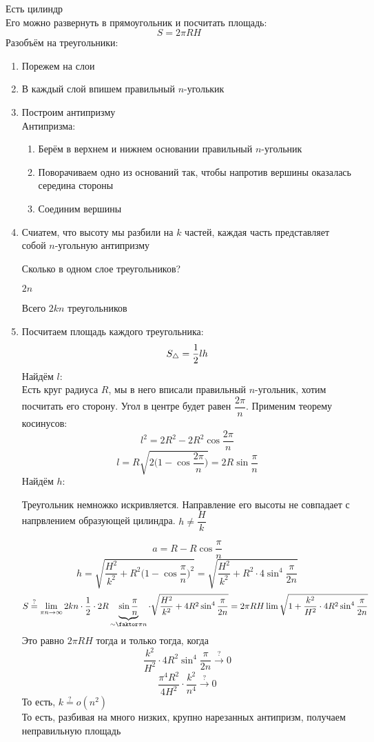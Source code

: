 \begin{eg}
	Есть цилиндр \\
	Его можно развернуть в прямоугольник и посчитать площадь:
	$$ S = 2\pi R H $$
	Разобъём на треугольники:
	\begin{enumerate}
		\item Порежем на слои
		\item В каждый слой впишем правильный $ n $-уголькик
		\item Построим антипризму \\
		Антипризма:
		\begin{enumerate}
			\item Берём в верхнем и нижнем основании правильный $ n $-угольник
			\item Поворачиваем одно из оснований так, чтобы напротив вершины оказалась середина стороны
			\item Соединим вершины
		\end{enumerate}
		\item Счиатем, что высоту мы разбили на $ k $ частей, каждая часть представляет собой $ n $-угольную антипризму
		\begin{quest}
			Сколько в одном слое треугольников?
		\end{quest}
		\begin{answer}
			$ 2n $
		\end{answer}
		Всего $ 2kn $ треугольников
		\item Посчитаем площадь каждого треугольника:
		$$ S_\triangle = \frac{1}2 lh $$
		Найдём $ l $: \\
		Есть круг радиуса $ R $, мы в него вписали правильный $ n $-угольник, хотим посчитать его сторону.  Угол в центре будет равен $ \dfrac{2\pi}n $. Применим теорему косинусов:
		$$ l^2 = 2R^2 - 2R^2 \cos \frac{2\pi}n $$
		$$ l = R \sqrt{2 \bigg( 1 - \cos \frac{2\pi}n \bigg) } = 2R\sin \frac\pi{n} $$
		Найдём $ h $:
		\begin{remark}
			Треугольник немножко искривляется. Направление его высоты не совпадает с напрвлением образующей цилиндра. $ h \bm{\ne} \dfrac{H}k $
		\end{remark}
		$$ a = R - R \cos \frac\pi{n} $$
		$$ h = \sqrt{\frac{H^2}{k^2} + R^2 \bigg(1 - \cos \frac\pi{n} \bigg)^2} = \sqrt{\frac{H^2}{k^2} + R^2 \cdot 4 \sin^4 \frac\pi{2n}} $$
		$$ S \stackrel?= \limi{\pi n} 2kn \cdot \half \cdot 2R\underbrace{\sin \frac\pi{n}}_{\sim \faktor\pi{n}} \cdot \sqrt{\frac{H^2}{k^2} + 4R^2 \sin^4 \frac\pi{2n}} = 2\pi RH \lim \sqrt{1 + \frac{k^2}{H^2} \cdot 4R^2 \sin^4 \frac\pi{2n}} $$
		Это равно $ 2\pi RH $ тогда и только тогда, когда
		$$ \frac{k^2}{H^2} \cdot 4R^2 \sin^4 \frac\pi{2n} \stackrel?\to 0 $$
		$$ \frac{\pi^4R^2}{4H^2} \cdot \frac{k^2}{n^4} \stackrel?\to 0 $$
		То есть, $ k \stackrel?= o(n^2) $ \\
		То есть, разбивая на много низких, крупно нарезанных антипризм, получаем неправильную площадь
	\end{enumerate}
\end{eg}

